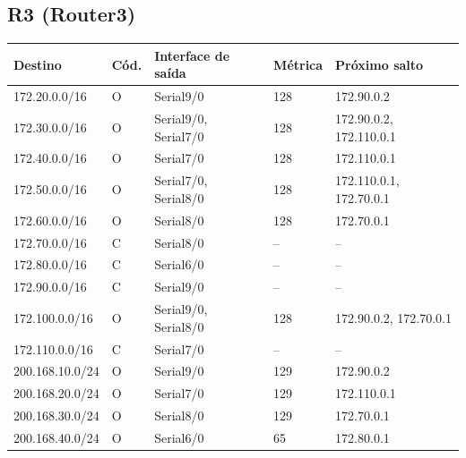 \subsection*{R3 (Router3)}
\begin{tabular}{@{}llllp{3.6cm}@{}}\toprule Destino & Cód. & Interface de saída & Métrica & Próximo salto\\\midrule
172.20.0.0/16 & O & Serial9/0 & 128 & 172.90.0.2\\
172.30.0.0/16 & O & Serial9/0, Serial7/0 & 128 & 172.90.0.2, 172.110.0.1\\
172.40.0.0/16 & O & Serial7/0 & 128 & 172.110.0.1\\
172.50.0.0/16 & O & Serial7/0, Serial8/0 & 128 & 172.110.0.1, 172.70.0.1\\
172.60.0.0/16 & O & Serial8/0 & 128 & 172.70.0.1\\
172.70.0.0/16 & C & Serial8/0 & -- & --\\
172.80.0.0/16 & C & Serial6/0 & -- & --\\
172.90.0.0/16 & C & Serial9/0 & -- & --\\
172.100.0.0/16 & O & Serial9/0, Serial8/0 & 128 & 172.90.0.2, 172.70.0.1\\
172.110.0.0/16 & C & Serial7/0 & -- & --\\
200.168.10.0/24 & O & Serial9/0 & 129 & 172.90.0.2\\
200.168.20.0/24 & O & Serial7/0 & 129 & 172.110.0.1\\
200.168.30.0/24 & O & Serial8/0 & 129 & 172.70.0.1\\
200.168.40.0/24 & O & Serial6/0 & 65 & 172.80.0.1\\
\bottomrule\end{tabular}

